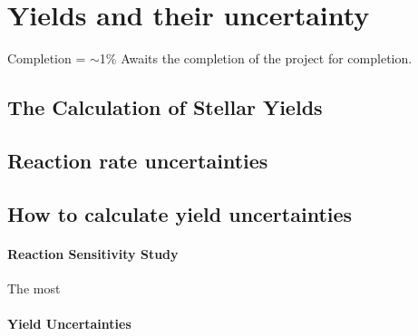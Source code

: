 \chapter{Yields and their uncertainty}

Completion = $\sim$1\%
Awaits the completion of the project for completion.

\section{The Calculation of Stellar Yields}



\section{Reaction rate uncertainties}

\section{How to calculate yield uncertainties}

\subsubsection{Reaction Sensitivity Study}

The most

\subsubsection{Yield Uncertainties}